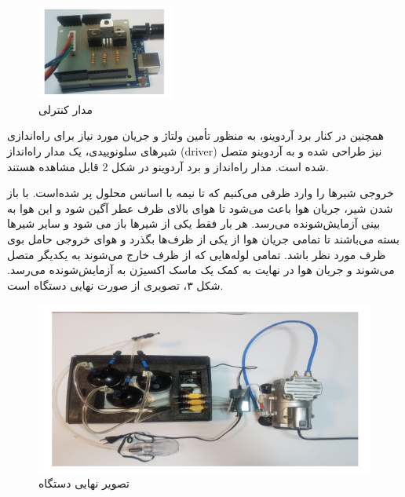 \documentclass[oneside]{report}
\begin{document}
\begin{figure}[h]
	\centering
	\includegraphics[width=0.4\textwidth]{arduino.png}
	\caption{مدار کنترلی}
	\label{fig:sche2}
\end{figure}


همچنین در کنار برد آردوینو، به منظور تأمین ولتاژ و جریان مورد نیاز برای راه‌اندازی شیرهای سلونوییدی، یک مدار راه‌انداز (driver) نیز طراحی شده و به آردوینو متصل شده است. مدار راه‌انداز و برد آردوینو در شکل
2 %
 قابل مشاهده هستند.


خروجی شیرها را وارد ظرفی می‌کنیم که تا نیمه با اسانس محلول پر شده‌است. با باز شدن شیر، جریان هوا باعث می‌شود تا هوای بالای ظرف عطر آگین شود و این هوا به بینی آزمایش‌شونده می‌رسد.
هر بار فقط یکی از شیرها باز می شود و سایر شیرها بسته می‌باشند تا تمامی جریان هوا از یکی از ظرف‌ها بگذرد و هوای خروجی حامل بوی ظرف مورد نظر باشد. تمامی لوله‌هایی که از ظرف خارج می‌شوند به یکدیگر متصل می‌شوند و جریان هوا در نهایت به کمک یک ماسک اکسیژن به آزمایش‌شونده می‌رسد.
شکل ۳، تصویری از صورت نهایی دستگاه است.
\begin{figure}[h]
	\centering
	\includegraphics[width=1\textwidth]{full.png}
	\caption{تصویر نهایی دستگاه}
	\label{fig:sche3}
\end{figure}
\end{document}
